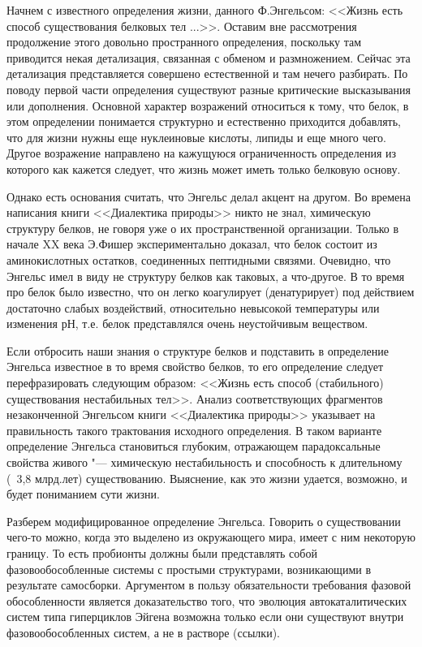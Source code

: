 \documentclass[12pt,a4paper,oneside]{book}
\begin{document}
Начнем с известного определения жизни, данного Ф.Энгельсом: <<Жизнь есть способ существования белковых тел ...>>. Оставим вне рассмотрения продолжение этого довольно пространного определения, поскольку там приводится некая детализация, связанная с обменом и размножением. Сейчас эта детализация представляется совершено естественной и там нечего разбирать. По поводу первой части определения существуют разные критические высказывания или дополнения. Основной характер возражений относиться к тому, что белок, в этом определении понимается структурно и естественно приходится добавлять, что для жизни нужны еще нуклеиновые кислоты, липиды и еще много чего. Другое возражение направлено на кажущуюся ограниченность определения из которого как кажется следует, что жизнь может иметь только белковую основу.

Однако есть основания считать, что Энгельс делал акцент на другом. Во времена написания книги <<Диалектика природы>> никто не знал, химическую структуру белков, не говоря уже о их пространственной организации. Только в начале XX века Э.Фишер экспериментально доказал, что белок состоит из аминокислотных остатков, соединенных пептидными связями. Очевидно, что Энгельс имел в виду не структуру белков как таковых, а что-другое. В то время про белок было известно, что он легко коагулирует (денатурирует) под действием достаточно слабых воздействий, относительно невысокой температуры или изменения рН, т.е. белок представлялся очень неустойчивым веществом.     

Если отбросить наши знания о структуре белков и подставить в определение Энгельса известное в то время свойство белков, то его определение следует перефразировать следующим образом: <<Жизнь есть способ (стабильного) существования нестабильных тел>>. Анализ соответствующих фрагментов незаконченной Энгельсом книги <<Диалектика природы>> указывает на правильность такого трактования исходного определения.  В таком варианте определение Энгельса становиться глубоким, отражающем парадоксальные свойства живого "--- химическую нестабильность и способность к длительному (~3,8 млрд.лет) существованию. Выяснение, как это жизни удается, возможно, и будет пониманием сути жизни.

Разберем модифицированное определение Энгельса. Говорить о существовании чего-то можно, когда это выделено из окружающего мира, имеет с ним некоторую границу. То есть пробионты должны были представлять собой фазовообособленные системы с простыми структурами, возникающими в результате самосборки. Аргументом в пользу обязательности требования фазовой обособленности является доказательство того, что эволюция автокаталитических систем типа гиперциклов Эйгена возможна только если они существуют внутри фазовообособленных систем, а не в растворе (ссылки). 
\end{document}
